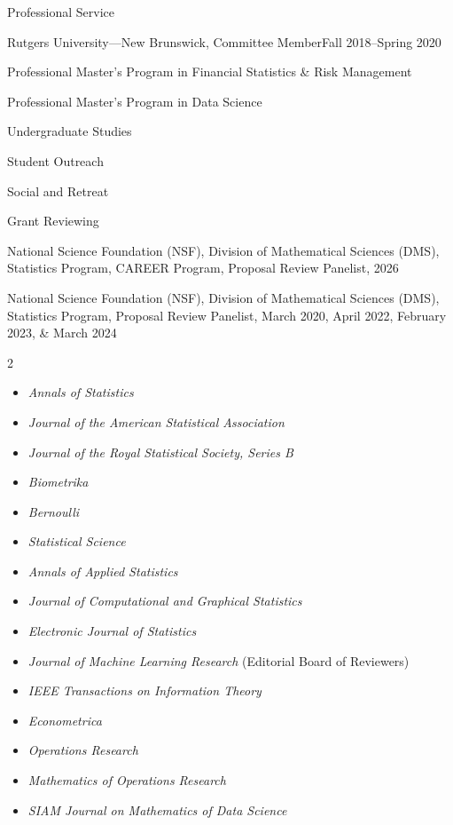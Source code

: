 \documentclass{resume}
\begin{document}
\begin{rSection}{Professional Service}
\begin{rSubsection}{Rutgers University---New Brunswick, Committee Member}{Fall 2018--Spring 2020}{}{}
\item {Professional Master's Program in Financial Statistics \& Risk Management}
\item {Professional Master's Program in Data Science}
\item {Undergraduate Studies}
\item {Student Outreach}
\item {Social and Retreat}
\end{rSubsection}

\begin{rSubsection}{Grant Reviewing}{}{}{}
\item {National Science Foundation (NSF), Division of Mathematical Sciences (DMS), Statistics Program, CAREER Program, Proposal Review Panelist, 2026}
\item {National Science Foundation (NSF), Division of Mathematical Sciences (DMS), Statistics Program, Proposal Review Panelist, March 2020, April 2022, February 2023, \& March 2024}
\end{rSubsection}

\begin{multicols}{2}
\raggedright
\begin{itemize}[leftmargin=1em,itemsep=3pt,parsep=0pt,topsep=0pt]
\item {\textit{Annals of Statistics}}
\item {\textit{Journal of the American Statistical Association}}
\item {\textit{Journal of the Royal Statistical Society, Series B}}
\item {\textit{Biometrika}}
\item {\textit{Bernoulli}}
\item {\textit{Statistical Science}}
\item {\textit{Annals of Applied Statistics}}
\item {\textit{Journal of Computational and Graphical Statistics}}
\item {\textit{Electronic Journal of Statistics}}
\item {\textit{Journal of Machine Learning Research} (Editorial Board of Reviewers)}
\item {\textit{IEEE Transactions on Information Theory}}
\item {\textit{Econometrica}}
\item {\textit{Operations Research}}
\item {\textit{Mathematics of Operations Research}}
\item {\textit{SIAM Journal on Mathematics of Data Science}}
\end{itemize}
\end{multicols}


\end{rSection}
\end{document}
